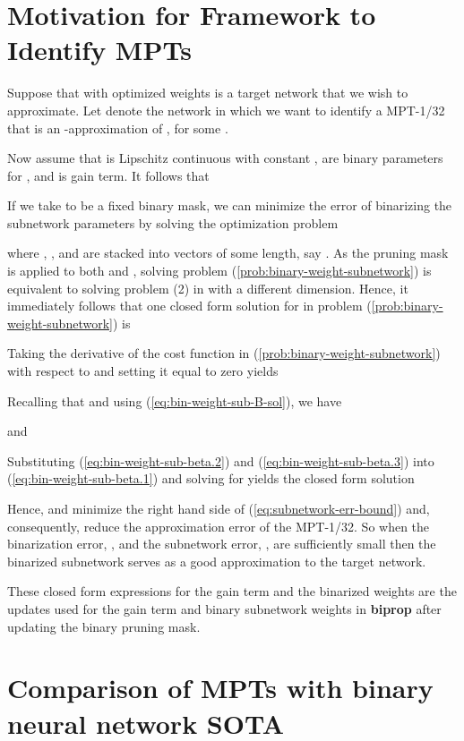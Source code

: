 \documentclass{article} \usepackage{iclr2021_conference,times}
\begin{document}
\section{Motivation for Framework to Identify MPTs} \label{sec:biprop-motivation}

Suppose that  with optimized weights  is a target network that we wish to approximate. Let  denote the network in which we want to identify a MPT-1/32 that is an -approximation of , for some . 

Now assume that  is Lipschitz continuous with constant ,  are binary parameters for , and  is gain term. It follows that

If we take  to be a fixed binary mask, we can minimize the error of binarizing the subnetwork parameters  by solving the optimization problem

where , , and  are stacked into vectors of some length, say . As the pruning mask  is applied to both  and , solving problem (\ref{prob:binary-weight-subnetwork}) is equivalent to solving problem (2) in \citep{rastegari2016xnornet} with a different dimension. Hence, it immediately follows that one closed form solution for  in problem (\ref{prob:binary-weight-subnetwork}) is

Taking the derivative of the cost function in (\ref{prob:binary-weight-subnetwork}) with respect to  and setting it equal to zero yields

Recalling that  and using (\ref{eq:bin-weight-sub-B-sol}), we have

and

Substituting (\ref{eq:bin-weight-sub-beta.2}) and (\ref{eq:bin-weight-sub-beta.3}) into (\ref{eq:bin-weight-sub-beta.1}) and solving for  yields the closed form solution

Hence,  and  minimize the right hand side of (\ref{eq:subnetwork-err-bound}) and, consequently, reduce the approximation error of the MPT-1/32. So when the binarization error, , and the subnetwork error, , are sufficiently small then the binarized subnetwork  serves as a good approximation to the target network. 

These closed form expressions for the gain term and the binarized weights are the updates used for the gain term and binary subnetwork weights in \textbf{biprop} after updating the binary pruning mask.


\section{Comparison of MPTs with binary neural network SOTA}
\label{sec:sota-comp}
\end{document}

